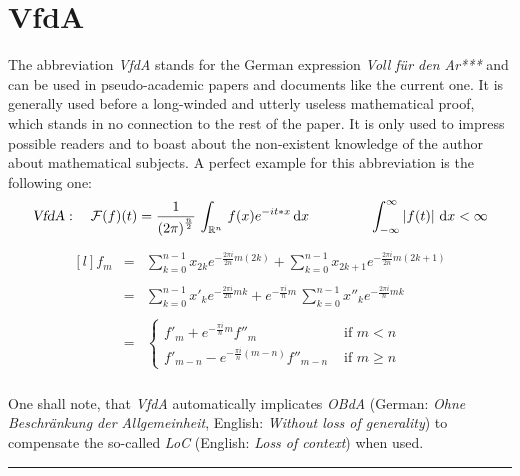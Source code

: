 \documentclass[pdftex,12pt,a4paper]{report}
\begin{document}
    \section{VfdA}
    The abbreviation \emph{VfdA} stands for the German expression \emph{Voll für den Ar***} and can be used in pseudo-academic papers and documents like the current one. It is generally used before a long-winded and utterly useless mathematical proof, which stands in no connection to the rest of the paper. It is only used to impress possible readers and to boast about the non-existent knowledge of the author about mathematical subjects. A perfect example for this abbreviation is the following one:
    \\
    \medskip
    \begin{equation*}
        \begin{aligned}
            \textsl{VfdA}: \quad \mathcal{F}(f)(t) = \frac{1}{\left( 2 \pi \right)^\frac{n}{2}} \, \int_{\mathbb{R}^n} \, f(x)e^{-it*x} \, \mathrm{d}x
            \qquad
            \qquad
            \
            \int_{-\infty}^{\infty} \left| f(t) \right| \, \mathrm{d}x < \infty
        \end{aligned}
    \end{equation*}
    \begin{equation*}
        \begin{aligned}
            \begin{matrix*}[l]
                f_m & = & \sum_{k=0}^{n-1} x_{2k} e^{- \frac{2 \pi i}{2 n} m (2k)} + \sum_{k=0}^{n-1} x_{2k + 1} e^{- \frac{2 \pi i}{2 n} m (2k + 1)}
                \\  &   &
                \\  & = & \sum_{k=0}^{n-1} x'_k e^{- \frac{2 \pi i}{2 n} mk} + e^{-\frac{\pi i}{n} m} \, \sum_{k=0}^{n-1} x''_k e^{- \frac{2 \pi i}{n} mk}
                \\  &   &
                \\  & = &
                \begin{cases}
                    f'_m + e^{- \frac{\pi i}{n} m} f''_m             & \text{ if } m < n \\
                    f'_{m-n} - e^{- \frac{\pi i}{n} (m-n)} f''_{m-n} & \text{ if } m \geq n
                \end{cases}
            \end{matrix*}
        \end{aligned}
    \end{equation*}
    \vspace{2mm}
    \\
    One shall note, that \emph{VfdA} automatically implicates \emph{OBdA} (German: \emph{Ohne Beschränkung der Allgemeinheit}, English: \emph{Without loss of generality}) to compensate the so-called \emph{LoC} (English: \emph{Loss of context}) when used.
    \vspace{5mm} \hrule \vspace{5mm}
\end{document}
